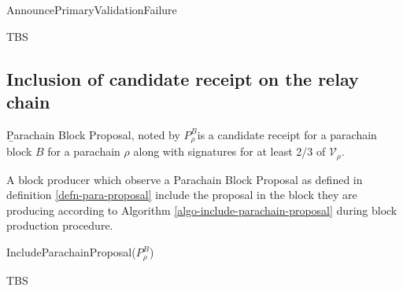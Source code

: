 \begin{algorithm}[H]
  \caption[]{\sc AnnouncePrimaryValidationFailure}
  \label{algo-announce-primary-validation-failure}
  \begin{algorithmic}[1]
    \Require{}

    \State TBS
  \end{algorithmic}
\end{algorithm}

\subsection{Inclusion of candidate receipt on the relay chain}\label{sect-inclusion-of-candidate-receipt}

\begin{definition}
  \label{defn-para-proposal}
        {\b Parachain Block Proposal}, noted by $P^B_{\rho}$is a candidate receipt for a parachain block $B$ for a parachain $\rho$ along with signatures for at least 2/3 of $\mathcal{V}_\rho$.  %

\end{definition}

A block producer which observe a Parachain Block Proposal as defined in definition \ref{defn-para-proposal}  include the proposal in the block they are producing according to Algorithm \ref{algo-include-parachain-proposal} during block production procedure.

\begin{algorithm}[H]
  \caption[]{\sc IncludeParachainProposal($P^B_{\rho}$)}
  \label{algo-include-parachain-proposal}
  \begin{algorithmic}[1]
    \Require{}

    \State TBS
  \end{algorithmic}
\end{algorithm}